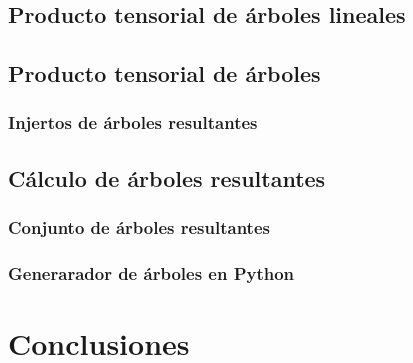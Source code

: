 \documentclass[11pt,a4paper,openright,oneside]{article}
\numberwithin{equation}{section}
\theoremstyle{definition}
\begin{document}
\subsection{Producto tensorial de \'arboles lineales}
\subsection{Producto tensorial de \'arboles}
\subsubsection{Injertos de \'arboles resultantes}
\subsection{C\'alculo de \'arboles resultantes}
\subsubsection{Conjunto de \'arboles resultantes}
\subsubsection{Generarador de \'arboles en Python}
\newpage


\section{Conclusiones}
\newpage

\end{document}
